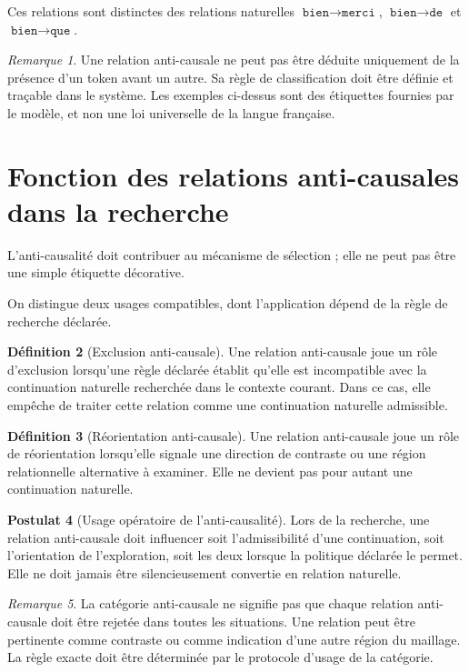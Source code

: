 \documentclass[11pt,a4paper]{report}
\theoremstyle{definition}
\newtheorem{definition}{Définition}[chapter]
\newtheorem{postulat}[definition]{Postulat}
\theoremstyle{plain}
\theoremstyle{remark}
\newtheorem{remarque}[definition]{Remarque}
\begin{document}
Ces relations sont distinctes des relations naturelles
\(\texttt{bien}\to\texttt{merci}\),
\(\texttt{bien}\to\texttt{de}\) et
\(\texttt{bien}\to\texttt{que}\).

\begin{remarque}
Une relation anti-causale ne peut pas être déduite uniquement
de la présence d'un token avant un autre. Sa règle de
classification doit être définie et traçable dans le système.
Les exemples ci-dessus sont des étiquettes fournies par le
modèle, et non une loi universelle de la langue française.
\end{remarque}

\section{Fonction des relations anti-causales dans la recherche}

L'anti-causalité doit contribuer au mécanisme de sélection ;
elle ne peut pas être une simple étiquette décorative.

On distingue deux usages compatibles, dont l'application dépend
de la règle de recherche déclarée.

\begin{definition}[Exclusion anti-causale]
Une relation anti-causale joue un rôle d'exclusion lorsqu'une
règle déclarée établit qu'elle est incompatible avec la
continuation naturelle recherchée dans le contexte courant.
Dans ce cas, elle empêche de traiter cette relation comme une
continuation naturelle admissible.
\end{definition}

\begin{definition}[Réorientation anti-causale]
Une relation anti-causale joue un rôle de réorientation lorsqu'elle
signale une direction de contraste ou une région relationnelle
alternative à examiner. Elle ne devient pas pour autant une
continuation naturelle.
\end{definition}

\begin{postulat}[Usage opératoire de l'anti-causalité]
Lors de la recherche, une relation anti-causale doit influencer
soit l'admissibilité d'une continuation, soit l'orientation de
l'exploration, soit les deux lorsque la politique déclarée le
permet. Elle ne doit jamais être silencieusement convertie en
relation naturelle.
\end{postulat}

\begin{remarque}
La catégorie anti-causale ne signifie pas que chaque relation
anti-causale doit être rejetée dans toutes les situations.
Une relation peut être pertinente comme contraste ou comme
indication d'une autre région du maillage. La règle exacte
doit être déterminée par le protocole d'usage de la catégorie.
\end{remarque}
\end{document}
